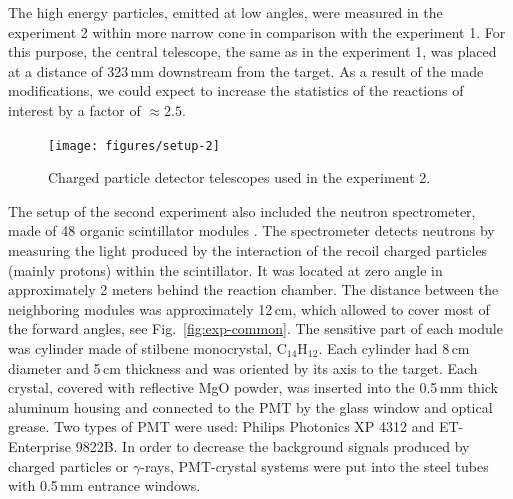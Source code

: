 The high energy particles, emitted at low angles, were measured in the experiment 2 within more narrow cone in comparison with the experiment 1.
For this purpose, the central telescope, the same as in the experiment 1, was placed at a distance of 323\,mm downstream from the target.
As a result of the made modifications, we could expect to increase the statistics of the reactions of interest by a factor of $\approx 2.5$.

\begin{figure}
	\begin{center}
		\texttt{[image: figures/setup-2]}
	\end{center}
	\caption{Charged particle detector telescopes used in the experiment 2.}
	\label{fig:setup-2}
\end{figure}

The setup of the second experiment also included the neutron spectrometer, made of 48 organic scintillator modules \cite{Bezbakh:2018}.
The spectrometer detects neutrons by measuring the light produced by the interaction of the recoil charged particles (mainly protons) within the scintillator.
It was located at zero angle in approximately 2 meters behind the reaction chamber.
The distance between the neighboring modules was approximately 12\,cm, which allowed to cover most of the forward angles, see Fig.\ \ref{fig:exp-common}.
The sensitive part of each module was cylinder made of stilbene monocrystal, C$_{14}$H$_{12}$. 
Each cylinder had 8\,cm diameter and 5\,cm thickness and was oriented by its axis to the target.
Each crystal, covered with reflective MgO powder, was inserted into the 0.5\,mm thick aluminum housing and connected to the PMT by the glass window and optical grease.
Two types of PMT were used: Philips Photonics XP 4312 and ET-Enterprise 9822B. 
In order to decrease the background signals produced by charged particles or $\gamma$-rays, PMT-crystal systems were put into the steel tubes with 0.5\,mm entrance windows.